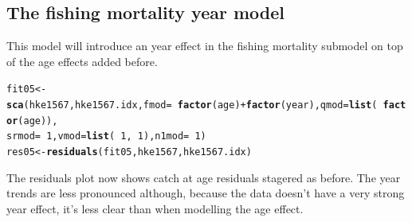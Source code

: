 \documentclass[a4paper,english,11pt]{article}\usepackage[]{graphicx}\usepackage[]{xcolor}
\makeatletter
\newcommand{\hlnum}[1]{\textcolor[rgb]{0.686,0.059,0.569}{#1}}%
\newcommand{\hlopt}[1]{\textcolor[rgb]{0,0,0}{#1}}%
\newcommand{\hldef}[1]{\textcolor[rgb]{0.345,0.345,0.345}{#1}}%
\newcommand{\hlkwb}[1]{\textcolor[rgb]{0.69,0.353,0.396}{#1}}%
\newcommand{\hlkwc}[1]{\textcolor[rgb]{0.333,0.667,0.333}{#1}}%
\newcommand{\hlkwd}[1]{\textcolor[rgb]{0.737,0.353,0.396}{\textbf{#1}}}%
\newenvironment{kframe}{%
 \def\at@end@of@kframe{}%
 \ifinner\ifhmode%
  \def\at@end@of@kframe{\end{minipage}}%
  \begin{minipage}{\columnwidth}%
 \fi\fi%
 \def\FrameCommand##1{\hskip\@totalleftmargin \hskip-\fboxsep
 \colorbox{shadecolor}{##1}\hskip-\fboxsep
     \hskip-\linewidth \hskip-\@totalleftmargin \hskip\columnwidth}%
 \MakeFramed {\advance\hsize-\width
   \@totalleftmargin\z@ \linewidth\hsize
   \@setminipage}}%
 {\par\unskip\endMakeFramed%
 \at@end@of@kframe}
\newenvironment{knitrout}{}{} %
\makeatother
\begin{document}
\subsection{The fishing mortality year model}

This model will introduce an year effect in the fishing mortality submodel on top of the age effects added before.

\begin{knitrout}
\color{fgcolor}\begin{kframe}
\begin{alltt}
\hldef{fit05} \hlkwb{<-} \hlkwd{sca}\hldef{(hke1567, hke1567.idx,} \hlkwc{fmod} \hldef{=} \hlopt{~}\hlkwd{factor}\hldef{(age)} \hlopt{+} \hlkwd{factor}\hldef{(year),} \hlkwc{qmod} \hldef{=} \hlkwd{list}\hldef{(}\hlopt{~}\hlkwd{factor}\hldef{(age)),}
    \hlkwc{srmod} \hldef{=} \hlopt{~}\hlnum{1}\hldef{,} \hlkwc{vmod} \hldef{=} \hlkwd{list}\hldef{(}\hlopt{~}\hlnum{1}\hldef{,} \hlopt{~}\hlnum{1}\hldef{),} \hlkwc{n1mod} \hldef{=} \hlopt{~}\hlnum{1}\hldef{)}
\hldef{res05} \hlkwb{<-} \hlkwd{residuals}\hldef{(fit05, hke1567, hke1567.idx)}
\end{alltt}
\end{kframe}
\end{knitrout}

The residuals plot now shows catch at age residuals stagered as before. The year trends are less pronounced although, because the data doesn't have a very strong year effect, it's less clear than when modelling the age effect. 
\end{document}
